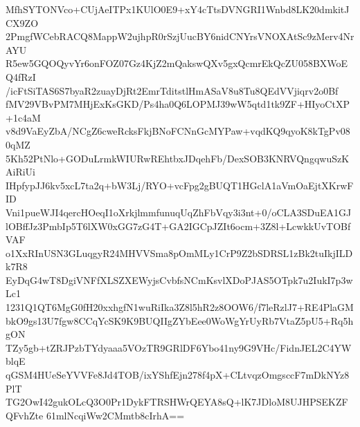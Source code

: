 MfhSYTONVco+CUjAeITPx1KUlO0E9+xY4cTtsDVNGRI1Wnbd8LK20dmkitJCX9ZO
2PmgfWCebRACQ8MappW2ujhpR0rSzjUucBY6nidCNYrsVNOXAtSc9zMerv4NrAYU
R5ew5GQOQyvYr6onFOZ07Gz4KjZ2mQakswQXv5gxQcmrEkQcZU058BXWoEQ4fRzI
/icFtSiTAS6S7byaR2zuayDjRt2EmrTditstlHmASaV8u8Tu8QEdVVjiqrv2o0Bf
fMV29VBvPM7MHjExKsGKD/Ps4ha0Q6LOPMJ39wW5qtd1tk9ZF+HIyoCtXP+1c4aM
v8d9VaEyZbA/NCgZ6cweRcksFkjBNoFCNnGcMYPaw+vqdKQ9qyoK8kTgPv080qMZ
5Kh52PtNlo+GODuLrmkWIURwREhtbxJDqehFb/DexSOB3KNRVQngqwuSzKAiRiUi
IHpfypJJ6kv5xcL7ta2q+bW3Lj/RYO+vcFpg2gBUQT1HGclA1aVmOaEjtXKrwFID
Vni1pueWJI4qercHOeqI1oXrkjlmmfunuqUqZhFbVqy3i3nt+0/oCLA3SDuEA1GJ
lOBffJz3PmbIp5T6lXW0xGG7zG4T+GA2IGCpJZIt6ocm+3Z8l+LcwkkUvTOBfVAF
o1XxRInUSN3GLuqgyR24MHVVSma8pOmMLy1CrP9Z2bSDRSL1zBk2tuIkjILDk7R8
EyDqG4wT8DgiVNFfXLSZXEWyjsCvbfsNCmKsvlXDoPJAS5OTpk7u2IukI7p3wLc1
1231Q1QT6MgG0fH20xxhgfN1wuRiIka3Z8l5hR2z8OOW6/f7leRzlJ7+RE4PlaGM
bkO9gs13U7fgw8CCqYcSK9K9BUQIIgZYbEee0WoWgYrUyRb7VtaZ5pU5+Rq5hgON
TZy5gb+tZRJPzbTYdyaaa5VOzTR9GRlDF6Ybo41ny9G9VHc/FidnJEL2C4YWblqE
qGSM4HUeSeYVVFe8Jd4TOB/ixYShfEjn278f4pX+CLtvqzOmgsccF7mDkNYz8PlT
TG2OwI42gukOLcQ3O0Pr1DykFTRSHWrQEYA8sQ+lK7JDloM8UJHPSEKZFQFvhZte
61mlNcqiWw2CMmtb8cIrhA==
